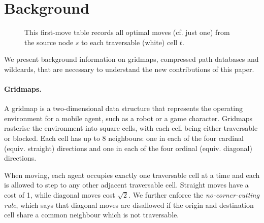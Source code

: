 \section{Background}
\label{sec:background}

\begin{figure}[t]
\centering
{}
\caption{
\label{fig:g}
This first-move table records all optimal moves (cf. just one) 
from the source node $s$ to each traversable
(white) cell $t$.  
}
\end{figure}  


We present background information on gridmaps, compressed path databases and wildcards,
that are necessary to understand the new contributions of this paper.

\paragraph{Gridmaps.} 
A gridmap is a two-dimensional data structure that represents the operating
environment for a mobile agent, such as a robot or a game character.
Gridmaps rasterise the environment into square cells, with each cell being 
either traversable or blocked. 
Each cell has up to 8 neighbours: one in each of the four cardinal 
(equiv. straight) directions and one in each of the four ordinal
(equiv. diagonal) directions.

When moving, each agent occupies exactly one traversable cell at a time and 
each is allowed to step to any other adjacent traversable cell.
Straight moves have a cost of 1, while diagonal moves cost $\sqrt{2}$. 
We further enforce the {\em no-corner-cutting rule}, which says that 
diagonal moves are disallowed if the origin and destination cell share a 
common neighbour which is not traversable.

